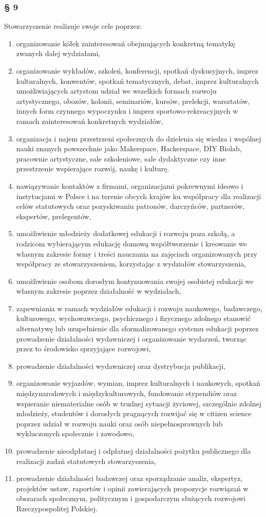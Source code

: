 \documentclass{article}
\newcommand{\myparagraph}[1]{\subsubsection*{#1}}
\begin{document}
\myparagraph{§ 9}
Stowarzyszenie realizuje swoje cele poprzez:
\begin{enumerate}
\item
  organizowanie kółek zainteresowań obejmujących konkretną tematykę zwanych dalej wydziałami,
\item
  organizowanie wykładów, szkoleń, konferencji, spotkań dyskusyjnych, imprez kulturalnych, konwentów, spotkań tematycznych, debat, imprez kulturalnych umożliwiających artystom udział we wszelkich formach rozwoju artystycznego, obozów, kolonii, seminariów, kursów, prelekcji, warsztatów, innych form czynnego wypoczynku i imprez sportowo-rekreacyjnych w ramach zainteresowań konkretnych wydziałów,
\item
  organizacja i najem przestrzeni społecznych do dzielenia się wiedza i wspólnej nauki znanych powszechnie jako Makerspace, Hackerspace, DIY Biolab, pracownie artystyczne, sale szkoleniowe, sale dydaktyczne czy inne przestrzenie wspierające rozwój, naukę i kulturę.
\item
  nawiązywanie kontaktów z firmami, organizacjami pokrewnymi ideowo i instytucjami w Polsce i na terenie obcych krajów ku współpracy dla
  realizacji celów statutowych oraz pozyskiwaniu patronów, darczyńców, partnerów, ekspertów, prelegentów,
\item
  umożliwienie młodzieży dodatkowej edukacji i rozwoju poza szkołą, a rodzicom wybierającym edukację domową współtworzenie i kreowanie we własnym zakresie formy i treści nauczania na zajęciach organizowanych przy współpracy ze stowarzyszeniem, korzystając z wydziałów stowarzyszenia,
\item
  umożliwienie osobom dorosłym kontynuowania swojej osobistej edukacji we własnym zakresie poprzez działalność w wydziałach,
\item
  zapewniania w ramach wydziałów edukacji i rozwoju naukowego, badawczego, kulturowego, wychowawczego, psychicznego i fizycznego zdolnego stanowić alternatywę lub uzupełnienie dla sformalizowanego systemu edukacji poprzez prowadzenie działalności wydawniczej i organizowanie wydarzeń, tworząc przez to środowisko sprzyjające rozwojowi,
\item
  prowadzenie działalności wydawniczej oraz dystrybucja publikacji,
\item
  organizowanie wyjazdów, wymian, imprez kulturalnych i naukowych, spotkań międzynarodowych i międzykulturowych, fundowanie stypendiów oraz wspieranie niematerialne osób w trudnej sytuacji życiowej, szczególnie zdolnej młodzieży, studentów i dorosłych pragnących rozwijać się w citizen science poprzez udział w rozwoju nauki oraz osób niepełnosprawnych lub wykluczonych społecznie i zawodowo,
\item
  prowadzenie nieodpłatnej i odpłatnej działalności pożytku publicznego dla realizacji zadań statutowych stowarzyszenia,
\item
  prowadzenie działalności badawczej oraz sporządzanie analiz, ekspertyz, projektów ustaw, raportów i opinii zawierających propozycje rozwiązań w obszarach społecznym, politycznym i gospodarczym służących rozwojowi Rzeczypospolitej Polskiej.
\end{enumerate}
\end{document}
